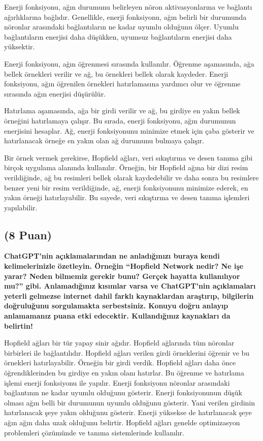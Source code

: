 \documentclass[11pt]{article}
\begin{document}
Enerji fonksiyonu, ağın durumunu belirleyen nöron aktivasyonlarına ve bağlantı ağırlıklarına bağlıdır. Genellikle, enerji fonksiyonu, ağın belirli bir durumunda nöronlar arasındaki bağlantıların ne kadar uyumlu olduğunu ölçer. Uyumlu bağlantıların enerjisi daha düşükken, uyumsuz bağlantıların enerjisi daha yüksektir.

Enerji fonksiyonu, ağın öğrenmesi sırasında kullanılır. Öğrenme aşamasında, ağa bellek örnekleri verilir ve ağ, bu örnekleri bellek olarak kaydeder. Enerji fonksiyonu, ağın öğrenilen örnekleri hatırlamasına yardımcı olur ve öğrenme sırasında ağın enerjisi düşürülür.

Hatırlama aşamasında, ağa bir girdi verilir ve ağ, bu girdiye en yakın bellek örneğini hatırlamaya çalışır. Bu sırada, enerji fonksiyonu, ağın durumunun enerjisini hesaplar. Ağ, enerji fonksiyonunu minimize etmek için çaba gösterir ve hatırlanacak örneğe en yakın olan ağ durumunu bulmaya çalışır.

Bir örnek vermek gerekirse, Hopfield ağları, veri sıkıştırma ve desen tanıma gibi birçok uygulama alanında kullanılır. Örneğin, bir Hopfield ağına bir dizi resim verildiğinde, ağ bu resimleri bellek olarak kaydedebilir ve daha sonra bu resimlere benzer yeni bir resim verildiğinde, ağ, enerji fonksiyonunu minimize ederek, en yakın örneği hatırlayabilir. Bu sayede, veri sıkıştırma ve desen tanıma işlemleri yapılabilir.

\subsection{(8 Puan)} \textbf{ChatGPT’nin açıklamalarından ne anladığınızı buraya kendi kelimelerinizle özetleyin. Örneğin ``Hopfield Network nedir? Ne işe yarar? Neden bilmemiz gerekir bunu? Gerçek hayatta kullanılıyor mu?'' gibi. Anlamadığınız kısımlar varsa ve ChatGPT’nin açıklamaları yeterli gelmezse internet dahil farklı kaynaklardan araştırıp, bilgilerin doğruluğunu sorgulamakta serbestsiniz. Konuyu doğru anlayıp anlamamanız puana etki edecektir. Kullandığınız kaynakları da belirtin!}

Hopfield ağları bir tür yapay sinir ağıdır. Hopfield ağlarında tüm nöronlar birbirleri ile bağlantılıdır. Hopfield ağları verilen girdi örneklerini öğrenir ve bu örnekleri hatırlayabilir. Örneğin bir girdi verdik. Hopfield ağları daha önce öğrendiklerinden bu girdiye en yakın olanı hatırlar. Bu öğrenme ve hatırlama işlemi enerji fonksiyonu ile yapılır. Enerji fonksiyonu nöronlar arasındaki bağlantının ne kadar uyumlu olduğunu gösterir. Enerji fonksiyonunun düşük olması ağın belli bir durumunun uyumlu olduğunu gösterir. Yani verilen girdinin hatırlanacak şeye yakın olduğunu gösterir. Enerji yüksekse de hatırlanacak şeye ağın ağın daha uzak olduğunu belirtir. Hopfield ağları genelde optimizasyon problemleri çözümünde ve tanıma sistemlerinde kullanılır.
\end{document}
